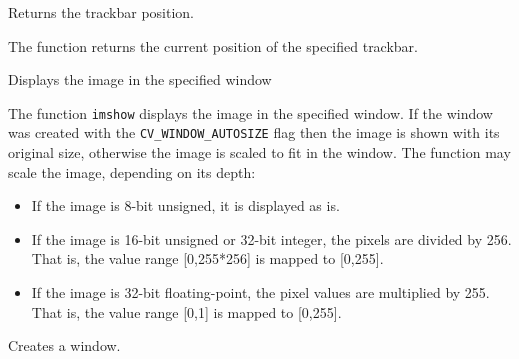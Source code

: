 Returns the trackbar position.

\begin{description}
\end{description}

The function returns the current position of the specified trackbar.


Displays the image in the specified window

\begin{description}
\end{description}

The function \texttt{imshow} displays the image in the specified window. If the window was created with the \texttt{CV\_WINDOW\_AUTOSIZE} flag then the image is shown with its original size, otherwise the image is scaled to fit in the window. The function may scale the image, depending on its depth:
\begin{itemize}
    \item If the image is 8-bit unsigned, it is displayed as is.
    \item If the image is 16-bit unsigned or 32-bit integer, the pixels are divided by 256. That is, the value range [0,255*256] is mapped to [0,255].
    \item If the image is 32-bit floating-point, the pixel values are multiplied by 255. That is, the value range [0,1] is mapped to [0,255].
\end{itemize}


Creates a window.

\begin{description}
\end{description}

